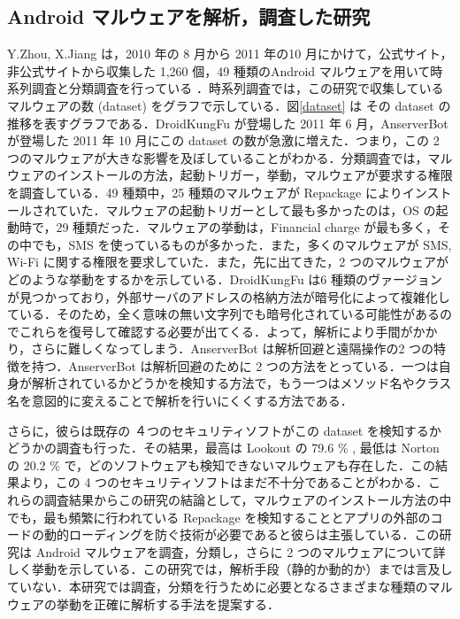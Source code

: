 \subsection{Android マルウェアを解析，調査した研究}
\label{researches}
Y.Zhou, X.Jiang は，2010 年の 8 月から 2011 年の10 月にかけて，公式サイト，非公式サイトから収集した 1,260 個，49 種類のAndroid マルウェアを用いて時系列調査と分類調査を行っている \cite{dissect} ．時系列調査では，この研究で収集しているマルウェアの数 (dataset) をグラフで示している．図\ref{dataset} は その dataset の推移を表すグラフである．DroidKungFu が登場した 2011 年 6 月，AnserverBot が登場した 2011 年 10 月にこの dataset の数が急激に増えた．つまり，この 2 つのマルウェアが大きな影響を及ぼしていることがわかる．分類調査では，マルウェアのインストールの方法，起動トリガー，挙動，マルウェアが要求する権限を調査している．49 種類中，25 種類のマルウェアが Repackage によりインストールされていた．マルウェアの起動トリガーとして最も多かったのは，OS の起動時で，29 種類だった．マルウェアの挙動は，Financial charge が最も多く，その中でも，SMS を使っているものが多かった．また，多くのマルウェアが SMS, Wi-Fi に関する権限を要求していた．また，先に出てきた，2 つのマルウェアがどのような挙動をするかを示している．DroidKungFu は6 種類のヴァージョンが見つかっており，外部サーバのアドレスの格納方法が暗号化によって複雑化している．そのため，全く意味の無い文字列でも暗号化されている可能性があるのでこれらを復号して確認する必要が出てくる．よって，解析により手間がかかり，さらに難しくなってしまう．AnserverBot は解析回避と遠隔操作の2 つの特徴を持つ．AnserverBot は解析回避のために 2 つの方法をとっている．一つは自身が解析されているかどうかを検知する方法で，もう一つはメソッド名やクラス名を意図的に変えることで解析を行いにくくする方法である．

さらに，彼らは既存の ４つのセキュリティソフトがこの  dataset を検知するかどうかの調査も行った．その結果，最高は Lookout の 79.6 \% , 最低は Norton の 20.2 \% で，どのソフトウェアも検知できないマルウェアも存在した．この結果より，この 4 つのセキュリティソフトはまだ不十分であることがわかる．これらの調査結果からこの研究の結論として，マルウェアのインストール方法の中でも，最も頻繁に行われている Repackage を検知することとアプリの外部のコードの動的ローディングを防ぐ技術が必要であると彼らは主張している．この研究は Android マルウェアを調査，分類し，さらに 2 つのマルウェアについて詳しく挙動を示している．この研究では，解析手段（静的か動的か）までは言及していない．本研究では調査，分類を行うために必要となるさまざまな種類のマルウェアの挙動を正確に解析する手法を提案する．


